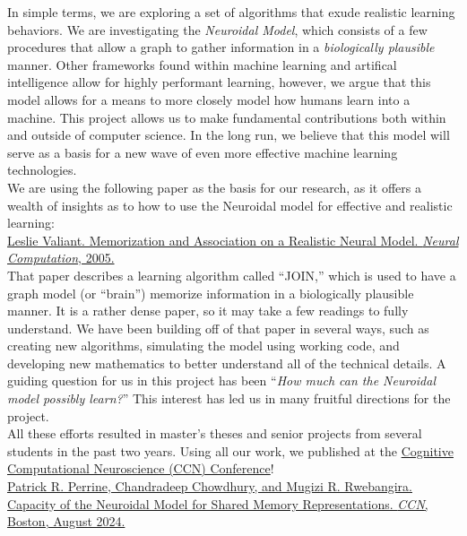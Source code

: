 \documentclass{article}
\begin{document}
\hfill 

In simple terms, we are exploring a set of algorithms that exude realistic learning behaviors. We are investigating the \emph{Neuroidal Model}, which consists of a few procedures that allow a graph to gather information in a \textit{biologically plausible} manner. Other frameworks found within machine learning and artifical intelligence allow for highly performant learning, however, we argue that this model allows for a means to more closely model how humans learn into a machine. This project allows us to make fundamental contributions both within and outside of computer science. In the long run, we believe that this model will serve as a basis for a new wave of even more effective machine learning technologies. \\

We are using the following paper as the basis for our research, as it offers a wealth of insights as to how to use the Neuroidal model for effective and realistic learning: \\

\noindent \href{https://doi.org/10.1162/0899766053019890}{Leslie Valiant. Memorization and Association on a Realistic Neural Model. \textit{Neural Computation}, 2005.} \\

\noindent That paper describes a learning algorithm called ``JOIN,'' which is used to have a graph model (or ``brain'') memorize information in a biologically plausible manner. It is a rather dense paper, so it may take a few readings to fully understand. We have been building off of that paper in several ways, such as creating new algorithms, simulating the model using working code, and developing new mathematics to better understand all of the technical details. A guiding question for us in this project has been ``\textit{How much can the Neuroidal model possibly learn?}'' This interest has led us in many fruitful directions for the project. \\

All these efforts resulted in master's theses and senior projects from several students in the past two years. Using all our work, we published at the \href{https://2024.ccneuro.org/}{Cognitive Computational Neuroscience (CCN) Conference}! \\

\noindent 
\href{https://2024.ccneuro.org/poster/?id=585}{Patrick R. Perrine, Chandradeep Chowdhury, and Mugizi R. Rwebangira. Capacity of the Neuroidal Model for Shared Memory Representations. \textit{CCN}, Boston, August 2024.} \\
\end{document}
